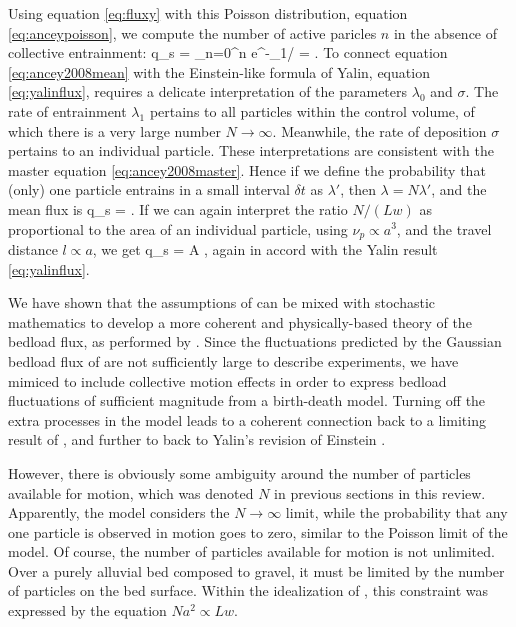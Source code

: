 Using equation \ref{eq:fluxy} with this Poisson distribution, equation \ref{eq:anceypoisson}, we compute the number of active paricles $n$ in the absence of collective entrainment: 
\be \bra q_s \ket =  \sum_{n=0}^\infty n e^{-\lambda_1/\sigma} =  . \label{eq:ancey2008mean}\ee
To connect equation \ref{eq:ancey2008mean} with the Einstein-like formula of Yalin, equation \ref{eq:yalinflux}, requires a delicate interpretation of the parameters $\lambda_0$ and $\sigma$. 
The rate of entrainment $\lambda_1$ pertains to all particles within the control volume, of which there is a very large number $N \rightarrow \infty$. 
Meanwhile, the rate of deposition $\sigma$ pertains to an individual particle. 
These interpretations are consistent with the master equation \ref{eq:ancey2008master}. 
Hence if we define the probability that (only) one particle entrains in a small interval $\delta t$ as $\lambda'$, then $\lambda = N\lambda'$, and the mean flux is 
\be \bra q_s \ket = .\ee
If we can again interpret the ratio $N/(Lw)$ as proportional to the area of an individual particle, using $\nu_p \propto a^3$, and the travel distance $l\propto a$, we get 
\be \bra q_s \ket = A , \ee
again in accord with the Yalin result \ref{eq:yalinflux}. 

We have shown that the assumptions of \citet{Einstein1950} can be mixed with stochastic mathematics to develop a more coherent and physically-based theory of the bedload flux, as performed by \citet{Ancey2006}. 
Since the fluctuations predicted by the Gaussian bedload flux of \citet{Ancey2006} are not sufficiently large to describe experiments, we have mimiced \citet{Ancey2008} to include collective motion effects in order to express bedload fluctuations of sufficient magnitude from a birth-death model. 
Turning off the extra processes in the \citet{Ancey2008} model leads to a coherent connection back to a limiting result of \citet{Ancey2006}, and further to back to Yalin's revision of Einstein \citep{Yalin1972}. 

However, there is obviously some ambiguity around the number of particles available for motion, which was denoted $N$ in previous sections in this review. 
Apparently, the \citet{Ancey2008} model considers the $N\rightarrow \infty$ limit, while the probability that any one particle is observed in motion goes to zero, similar to the Poisson limit of the \citet{Ancey2006} model. 
Of course, the number of particles available for motion is not unlimited. 
Over a purely alluvial bed composed to gravel, it must be limited by the number of particles on the bed surface. 
Within the idealization of \citet{Einstein1950}, this constraint was expressed by the equation $N a^2 \propto Lw$. 

